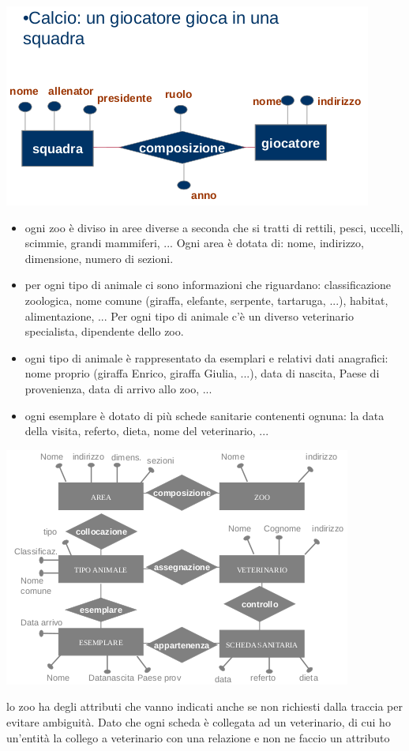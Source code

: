 \documentclass[a4paper,12pt, oneside]{book}
\begin{document}
\begin{center}
\includegraphics[scale=1]{img/er2.png}
\end{center}
\begin{esempio}
\begin{itemize}
\item ogni zoo è diviso in aree diverse a seconda che si tratti di rettili, pesci, uccelli, scimmie, grandi mammiferi, ... Ogni area è dotata di: nome,
indirizzo, dimensione, numero di sezioni.
\item per ogni tipo di animale ci sono informazioni che riguardano: classificazione zoologica, nome comune (giraffa, elefante, serpente,
tartaruga, ...), habitat, alimentazione, ... Per ogni tipo di animale c'è un diverso veterinario specialista, dipendente dello zoo.
\item ogni tipo di animale è rappresentato da esemplari e relativi dati anagrafici: nome proprio (giraffa Enrico, giraffa Giulia, ...), data di nascita,
Paese di provenienza, data di arrivo allo zoo, ...
\item ogni esemplare è dotato di più schede sanitarie contenenti ognuna: la data della visita, referto, dieta, nome del veterinario, ...

\end{itemize}
\begin{center}
\includegraphics[scale=0.8]{img/er3.png}
\end{center}
lo zoo ha degli attributi che vanno indicati anche se non richiesti dalla traccia per evitare ambiguità. Dato che ogni scheda è collegata ad un veterinario, di cui ho un'entità la collego a veterinario con una relazione e non ne faccio  un attributo
\end{esempio}
\end{document}
